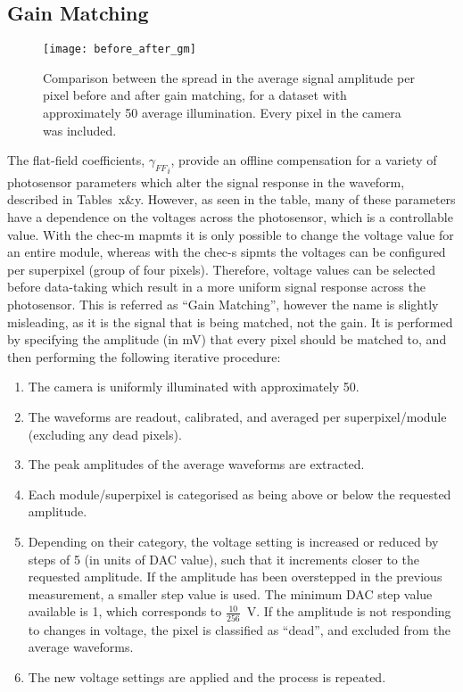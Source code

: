 \subsection{Gain Matching}

\begin{figure}
	\centering
    \texttt{[image: before\_after\_gm]} 
	\caption[Gain-Matching Residuals]{Comparison between the spread in the average signal amplitude per pixel before and after gain matching, for a dataset with approximately \SI{50}{\pe} average illumination. Every pixel in the camera was included.} 
	\label{fig:before_after_gm}
\end{figure}

The flat-field coefficients, ${\gamma_{FF}}_i$, provide an offline compensation for a variety of photosensor parameters which alter the signal response in the waveform, described in Tables~x\&y. However, as seen in the table, many of these parameters have a dependence on the voltages across the photosensor, which is a controllable value. With the \gls{chec-m} \glspl{mapmt} it is only possible to change the voltage value for an entire module, whereas with the \gls{chec-s} \glspl{sipmt} the voltages can be configured per superpixel (group of four pixels). Therefore, voltage values can be selected before data-taking which result in a more uniform signal response across the photosensor. This is referred as ``Gain Matching'', however the name is slightly misleading, as it is the signal that is being matched, not the gain. It is performed by specifying the amplitude (in \si{mV}) that every pixel should be matched to, and then performing the following iterative procedure:
\begin{enumerate}
	\item The camera is uniformly illuminated with approximately \SI{50}{\pe}.
	\item The waveforms are readout, calibrated, and averaged per superpixel/module (excluding any dead pixels).
    \item The peak amplitudes of the average waveforms are extracted.
    \item Each module/superpixel is categorised as being above or below the requested amplitude.
    \item Depending on their category, the voltage setting is increased or reduced by steps of 5 (in units of DAC value), such that it increments closer to the requested amplitude. If the amplitude has been overstepped in the previous measurement, a smaller step value is used. The minimum DAC step value available is 1, which corresponds to $\frac{10}{256}$~V. If the amplitude is not responding to changes in voltage, the pixel is classified as ``dead'', and excluded from the average waveforms.
    \item The new voltage settings are applied and the process is repeated.
\end{enumerate}


